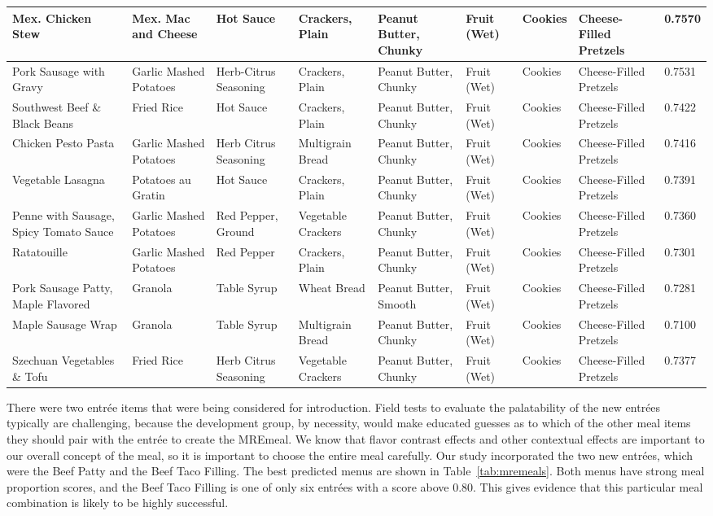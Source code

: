 \begin{landscape}
\begin{longtable}{p{3.0cm}p{3.7cm}p{2.2cm}p{2.0cm}p{2.3cm}p{0.8cm}p{1.5cm}p{2.2cm}p{0.8cm}}
\midrule
Mex. Chicken Stew & Mex. Mac and Cheese & Hot Sauce & Crackers, Plain & Peanut Butter, Chunky & Fruit (Wet) & Cookies & Cheese-Filled Pretzels & 0.7570 \\
\midrule
Pork Sausage with Gravy & Garlic Mashed Potatoes & Herb-Citrus Seasoning & Crackers, Plain & Peanut Butter, Chunky & Fruit (Wet) & Cookies & Cheese-Filled Pretzels & 0.7531 \\
\midrule
Southwest Beef \& Black Beans & Fried Rice & Hot Sauce & Crackers, Plain & Peanut Butter, Chunky & Fruit (Wet) & Cookies & Cheese-Filled Pretzels & 0.7422 \\
\midrule
Chicken Pesto Pasta & Garlic Mashed Potatoes & Herb Citrus Seasoning & Multigrain Bread & Peanut Butter, Chunky & Fruit (Wet) & Cookies & Cheese-Filled Pretzels & 0.7416 \\
\midrule
Vegetable Lasagna & Potatoes au Gratin & Hot Sauce & Crackers, Plain & Peanut Butter, Chunky & Fruit (Wet) & Cookies & Cheese-Filled Pretzels & 0.7391 \\
\midrule
Penne with Sausage, Spicy Tomato Sauce & Garlic Mashed Potatoes & Red Pepper, Ground & Vegetable Crackers & Peanut Butter, Chunky & Fruit (Wet) & Cookies & Cheese-Filled Pretzels & 0.7360 \\
\midrule
Ratatouille & Garlic Mashed Potatoes & Red Pepper & Crackers, Plain & Peanut Butter, Chunky & Fruit (Wet) & Cookies & Cheese-Filled Pretzels & 0.7301 \\
\midrule
Pork Sausage Patty, Maple Flavored & Granola & Table Syrup & Wheat Bread & Peanut Butter, Smooth & Fruit (Wet) & Cookies & Cheese-Filled Pretzels & 0.7281 \\
\midrule
Maple Sausage Wrap & Granola & Table Syrup & Multigrain Bread & Peanut Butter, Chunky & Fruit (Wet) & Cookies & Cheese-Filled Pretzels & 0.7100 \\
\midrule
Szechuan Vegetables \& Tofu & Fried Rice & Herb Citrus Seasoning & Vegetable Crackers & Peanut Butter, Chunky & Fruit (Wet) & Cookies & Cheese-Filled Pretzels & 0.7377 \\
\end{longtable}
\end{landscape}

There were two entr\'{e}e items that were being considered for introduction.  Field tests to evaluate the palatability of the new entr\'{e}es typically are challenging, because the development group, by necessity, would make educated guesses as to which of the other meal items they should pair with the entr\'{e}e to create the MRE\tm meal.  We know that flavor contrast effects and other contextual effects are important to our overall concept of the meal, so it is important to choose the entire meal carefully.  Our study incorporated the two new entr\'{e}es, which were the Beef Patty and the Beef Taco Filling.  The best predicted menus are shown in Table~\ref{tab:mremeals}.  Both menus have strong meal proportion scores, and the Beef Taco Filling is one of only six entr\'{e}es with a score above 0.80.  This gives evidence that this particular meal combination is likely to be highly successful.  

